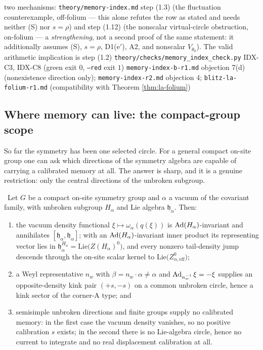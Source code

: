 {two mechanisms: \texttt{theory/memory-index.md} step (1.3) (the
 fluctuation counterexample, off-folium --- this alone refutes the row as
 stated and needs neither (S) nor $s=\rho$) and step (1.12) (the nonscalar
 virtual-circle obstruction, on-folium --- a \emph{strengthening}, not a
 second proof of the same statement: it additionally assumes (S), $s=\rho$,
 D1(e$'$), A2, and nonscalar $V_{\theta_0}$). The valid arithmetic
 implication is step (1.2)}
{\texttt{theory/checks/memory\_index\_check.py} IDX-C3, IDX-C8 (green exit
 $0$, \texttt{--red} exit $1$)}
{\texttt{memory-index-b-r1.md} objection 7(d) (nonexistence direction only);
 \texttt{memory-index-r2.md} objection 4; \texttt{blitz-la-folium-r1.md}
 (compatibility with Theorem \ref{thm:la-folium})}

\subsection{Where memory can live: the compact-group scope}

So far the symmetry has been one selected circle. For a general compact
on-site group one can ask which directions of the symmetry algebra are
capable of carrying a calibrated memory at all. The answer is sharp, and it is
a genuine restriction: only the central directions of the unbroken subgroup.

\begin{theorem}
\label{thm:scope-center}
\statusProved\
Let $G$ be a compact on-site symmetry group and $\alpha$ a vacuum of the
covariant family, with unbroken subgroup $H_\alpha$ and Lie algebra
$\mathfrak{h}_\alpha$. Then:
\begin{enumerate}
\item[(i)] the vacuum density functional
  $\xi\mapsto\omega_\alpha(q(\xi))$ is $\operatorname{Ad}(H_\alpha)$-invariant and
  annihilates $[\mathfrak{h}_\alpha,\mathfrak{h}_\alpha]$; with an
  $\operatorname{Ad}(H_\alpha)$-invariant inner product its representing vector lies in
  $\mathfrak{h}_\alpha^{H_\alpha}=\mathrm{Lie}\bigl(Z(H_\alpha)^{0}\bigr)$, and
  every nonzero tail-density jump descends through the on-site scalar kernel
  to $\mathrm{Lie}\bigl(Z_{\alpha,\mathrm{eff}}^{0}\bigr)$;
\item[(ii)] a Weyl representative $n_w$ with $\beta=n_w\cdot\alpha\neq\alpha$
  and $\operatorname{Ad}_{n_w^{-1}}\xi=-\xi$ supplies an opposite-density kink pair
  $(+s,-s)$ on a common unbroken circle, hence a kink sector of the
  corner-A type; and
\item[(iii)] semisimple unbroken directions and finite groups supply no
  calibrated memory: in the first case the vacuum density vanishes, so no
  positive calibration $s$ exists; in the second there is no Lie-algebra
  circle, hence no current to integrate and no real displacement calibration
  at all.
\end{enumerate}
\end{theorem}

